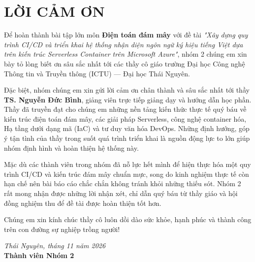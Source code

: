 
\chapter*{LỜI CẢM ƠN}

Để hoàn thành bài tập lớn môn \textbf{Điện toán đám mây} với đề tài \textit{"Xây dựng quy trình CI/CD và triển khai hệ thống nhận diện ngôn ngữ ký hiệu tiếng Việt dựa trên kiến trúc Serverless Container trên Microsoft Azure"}, nhóm 2 chúng em xin bày tỏ lòng biết ơn sâu sắc nhất tới các thầy cô giáo trường Đại học Công nghệ Thông tin và Truyền thông (ICTU) — Đại học Thái Nguyên.

Đặc biệt, nhóm chúng em xin gửi lời cảm ơn chân thành và sâu sắc nhất tới thầy \textbf{TS. Nguyễn Đức Bình}, giảng viên trực tiếp giảng dạy và hướng dẫn học phần. Thầy đã truyền đạt cho chúng em những nền tảng kiến thức thực tế quý báu về kiến trúc điện toán đám mây, các giải pháp Serverless, công nghệ container hóa, Hạ tầng dưới dạng mã (IaC) và tư duy văn hóa DevOps. Những định hướng, góp ý tận tình của thầy trong suốt quá trình triển khai là nguồn động lực to lớn giúp nhóm định hình và hoàn thiện hệ thống này.

Mặc dù các thành viên trong nhóm đã nỗ lực hết mình để hiện thực hóa một quy trình CI/CD và kiến trúc đám mây chuẩn mực, song do kinh nghiệm thực tế còn hạn chế nên bài báo cáo chắc chắn không tránh khỏi những thiếu sót. Nhóm 2 rất mong nhận được những lời nhận xét, chỉ dẫn quý báu từ thầy giáo và hội đồng nghiệm thu để đề tài được hoàn thiện tốt hơn.

Chúng em xin kính chúc thầy cô luôn dồi dào sức khỏe, hạnh phúc và thành công trên con đường sự nghiệp trồng người!

\vspace{1.0cm}
\begin{flushright}
    \textit{Thái Nguyên, tháng 11 năm 2026}\\[0.3cm]
    \textbf{Thành viên Nhóm 2}\\[0.2cm]
\end{flushright}
